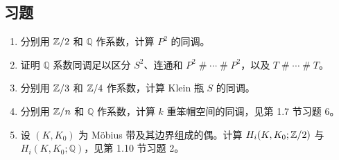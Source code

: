 \subsection*{习题}
\begin{enumerate}
\item 分别用 $\mathbb{Z}/2$ 和 $\mathbb Q$ 作系数，计算 $P^2$ 的同调。
\item 证明 $\mathbb Q$ 系数同调足以区分 $S^2$、连通和 $P^2\mathbin{\#}\cdots\mathbin{\#}P^2$，以及 $T\mathbin{\#}\cdots\mathbin{\#}T$。
\item 分别用 $\mathbb{Z}/3$ 和 $\mathbb{Z}/4$ 作系数，计算 Klein 瓶 $S$ 的同调。
\item 分别用 $\mathbb{Z}/n$ 和 $\mathbb Q$ 作系数，计算 $k$ 重笨帽空间的同调，见第 1.7 节习题 6。
\item 设 $(K,K_0)$ 为 Möbius 带及其边界组成的偶。计算 $H_i(K,K_0;\mathbb{Z}/2)$ 与 $H_i(K,K_0;\mathbb Q)$，见第 1.10 节习题 2。
\end{enumerate}
